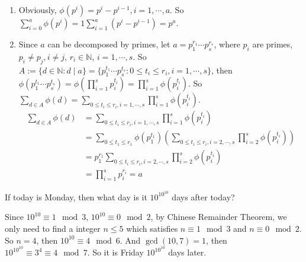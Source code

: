 \documentclass{ctexart}
\begin{document}
\begin{solution}
  \begin{enumerate}
    \item Obviously, \(\phi(p^i)=p^i-p^{i-1}, i=1,\cdots,a\). So \(\sum_{i=0}^{a} \phi(p^i)=1 \sum_{i=1}^{a}(p^i-p^{i-1})=p^a\).
    \item Since \(a\) can be decomposed by primes, let \(a=p_1^{r_1}\cdots p_s^{r_s}\), where \(p_i\) are primes,
      \(p_i \neq p_j,i \neq j\), \(r_i \in \mathbb{N}\), \(i=1,\cdots,s\).
      So \(A:=\{d \in \mathbb{N}: d \mid a\}=\{p_1^{t_1}\cdots p_s^{t_s}: 0 \leq t_i \leq r_i, i=1,\cdots,s\}\), then
      \(\phi(p_1^{t_1}\cdots p_s^{t_s})=\phi(\prod_{i=1}^s p_i^{t_i})=\prod_{i =1}^{s} \phi(p_i^{t_i})\).
      So \(\sum_{d \in A}\phi(d)=\sum_{0 \leq t_i \leq r_i,i=1,\cdots,s} \prod_{i=1}^s \phi(p_i^{t_i})\).
      \begin{equation}\label{equ:42.3}
        \begin{aligned}
          \sum_{d \in A}\phi(d) & =\sum_{0 \leq t_i \leq r_i,i=1,\cdots,s} \prod_{i=1}^s \phi(p_i^{t_i})                                                   \\
                                & =\sum_{0 \leq t_1 \leq r_1} \phi(p_1^{t_1})(\sum_{0 \leq t_i \leq r_i, i =2,\cdots,s} \prod_{i=2}^{s}  \phi(p_i^{t_i}) ) \\
                                & =p_1^{r_1}\sum_{0 \leq t_i \leq r_i, i = 2,\cdots,s} \prod_{i =2}^{s} \phi(p_i^{t_i})                                    \\
                                & =\prod_{i=1}^{s} p_i^{r_i}=a
        \end{aligned}
      \end{equation}

  \end{enumerate}
\end{solution}

\begin{problem}\label{pro:45.1}
  If today is Monday, then what day is it \(10^{10^{10}}\) days after today?
\end{problem}
\begin{solution}
  Since \(10^{10} \equiv 1 \mod 3\), \(10^{10} \equiv 0 \mod 2\), by Chinese Remainder Theorem, we only need to
  find a integer \(n \leq 5\) which satisfies \(n \equiv 1 \mod 3\) and \(n \equiv 0 \mod 2\).
  So \(n=4\), then \(10^{10} \equiv 4 \mod 6\). And \(\gcd(10,7)=1\), then \(10^{10^{10}} \equiv 3^{4} \equiv 4 \mod 7\).
  So it is Friday \(10^{10^{10}}\) days later.
\end{solution}
\end{document}
